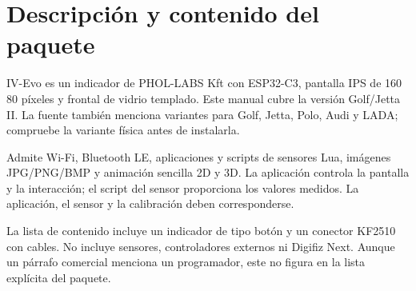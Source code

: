 \chapter{Descripción y contenido del paquete}
IV-Evo es un indicador de PHOL-LABS Kft con ESP32-C3, pantalla IPS de 160\,\texttimes\,80 píxeles y frontal de vidrio templado. Este manual cubre la versión Golf/Jetta II. La fuente también menciona variantes para Golf, Jetta, Polo, Audi y LADA; compruebe la variante física antes de instalarla.

Admite Wi-Fi, Bluetooth LE, aplicaciones y scripts de sensores Lua, imágenes JPG/PNG/BMP y animación sencilla 2D y 3D. La aplicación controla la pantalla y la interacción; el script del sensor proporciona los valores medidos. La aplicación, el sensor y la calibración deben corresponderse.

La lista de contenido incluye un indicador de tipo botón y un conector KF2510 con cables. No incluye sensores, controladores externos ni Digifiz Next. Aunque un párrafo comercial menciona un programador, este no figura en la lista explícita del paquete.
